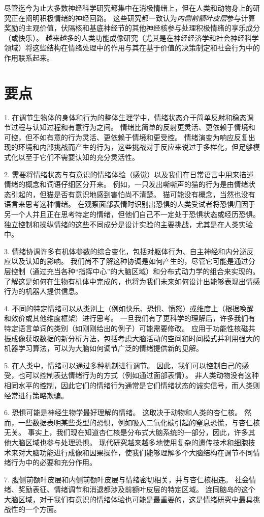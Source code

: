 尽管迄今为止大多数神经科学研究都集中在消极情绪上，但在人类和动物身上的研究正在阐明积极情绪的神经回路。
这些研究都一致认为\textit{内侧前额叶皮层}参与计算奖励的主观价值，伏隔核和基底神经节的其他神经核参与处理积极情绪的享乐成分（或快乐）。
越来越多的人类功能成像研究（尤其是在神经经济学和社会神经科学领域）将这些结构在情绪处理中的作用与其在基于价值的决策制定和社会行为中的作用联系起来。



\section{要点}

1. 在调节生物体的身体和行为的整体生理学中，情绪状态介于简单反射和稳态调节过程与认知过程和有意行为之间。
情绪比简单的反射更灵活、更依赖于情境和可控，但不如有意的行为灵活、更依赖于情境和更受控。
情绪演变为响应反复出现的环境和内部挑战而产生的行为，这些挑战对于反应来说过于多样化，但足够模式化以至于它们不需要认知的充分灵活性。


2. 需要将情绪状态与有意识的情绪体验（感觉）以及我们在日常语言中用来描述情绪的概念和词语仔细区分开来。
例如，一只发出嘶嘶声的猫的行为是由情绪状态引起的，但猫是否有意识地感到害怕尚不清楚。
猫可能没有概念，当然也没有语言来思考这种情绪。
在观察面部表情时识别出恐惧的人类受试者将恐惧归因于另一个人并且正在思考特定的情绪，但他们自己不一定处于恐惧状态或经历恐惧。
独立控制和操纵情绪的这些不同成分是设计实验的主要挑战，尤其是在人类实验中。


3. 情绪协调许多有机体参数的综合变化，包括对躯体行为、自主神经和内分泌反应以及认知的影响。
我们尚不了解这种协调是如何产生的，尽管它可能是通过分层控制（通过充当各种“指挥中心”的大脑区域）和分布式动力学的组合来实现的。
了解这是如何在生物有机体中完成的，也将为我们未来如何设计出能够表现出情感行为的机器人提供信息。


4. 不同的特定情绪可以从类别上（例如快乐、恐惧、愤怒）或维度上（根据唤醒和效价或其他维度框架）进行思考。
一旦我们有了更科学的理解后，许多我们有特定语言单词的类别（如刚刚给出的例子）可能需要修改。
应用于功能性核磁共振成像获取数据的新分析方法，包括考虑大脑活动的空间和时间模式并利用强大的机器学习算法，可以为大脑如何调节广泛的情绪提供新的见解。


5. 在人类中，情绪可以通过多种机制进行调节。
因此，我们可以控制自己的感受，也可以控制表达情绪行为的方式（例如通过面部表情）。
非人类动物没有这种相同水平的控制，因此它们的情绪行为通常是它们情绪状态的诚实信号，而人类则经常进行策略欺骗。


6. 恐惧可能是神经生物学最好理解的情绪。
这取决于动物和人类的杏仁核。
然而，一些数据表明某些类型的恐惧，例如吸入二氧化碳引起的窒息恐慌，与杏仁核无关。
事实上，我们现在知道杏仁核是分布式大脑系统的一部分，因此，许多其他大脑区域也参与处理恐惧。
现代研究越来越多地使用复杂的遗传技术和细胞技术来对大脑功能进行成像和因果操作，使我们能够理解多个大脑结构在调节不同情绪行为中的必要和充分作用。


7. 腹侧前额叶皮层和内侧前额叶皮层与情绪密切相关，并与杏仁核相连。
社会情绪、奖励表征、情绪调节和消退都涉及前额叶皮层的特定区域。
连同脑岛的这个大脑区域，对于我们有意识的情绪体验也可能是最重要的，这是情绪研究中最具挑战性的一个方面。

